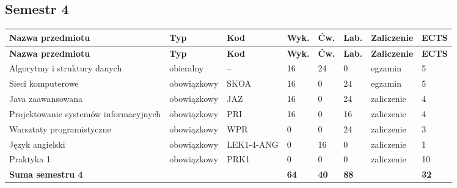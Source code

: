 \documentclass[12pt,a4paper]{article}
\newcommand{\thdrule}{\noalign{\global\setlength{\extrarowheight}{0pt}}}
\newcommand{\thdend}{\noalign{\global\setlength{\extrarowheight}{4pt}}}
\begin{document}
\subsection*{Semestr 4}

{\scriptsize
\begin{longtable}{>{\RaggedRight}m{5.0cm}m{1.9cm}m{0.75cm}m{0.85cm}m{0.85cm}m{0.85cm}m{1.45cm}m{0.9cm}}
\thdrule\toprule
\rowcolor{pjatkRed}
{\color{white}\footnotesize\textbf{\vphantom{Ag}Nazwa przedmiotu}} & {\color{white}\footnotesize\textbf{\vphantom{Ag}Typ}} & {\color{white}\footnotesize\textbf{\vphantom{Ag}Kod}} & {\color{white}\footnotesize\textbf{\vphantom{Ag}Wyk.}} & {\color{white}\footnotesize\textbf{\vphantom{Ag}Ćw.}} & {\color{white}\footnotesize\textbf{\vphantom{Ag}Lab.}} & {\color{white}\footnotesize\textbf{\vphantom{Ag}Zaliczenie}} & {\color{white}\footnotesize\textbf{\vphantom{Ag}ECTS}} \\
\midrule\thdend
\endfirsthead
\thdrule\toprule
\rowcolor{pjatkRed}
{\color{white}\footnotesize\textbf{\vphantom{Ag}Nazwa przedmiotu}} & {\color{white}\footnotesize\textbf{\vphantom{Ag}Typ}} & {\color{white}\footnotesize\textbf{\vphantom{Ag}Kod}} & {\color{white}\footnotesize\textbf{\vphantom{Ag}Wyk.}} & {\color{white}\footnotesize\textbf{\vphantom{Ag}Ćw.}} & {\color{white}\footnotesize\textbf{\vphantom{Ag}Lab.}} & {\color{white}\footnotesize\textbf{\vphantom{Ag}Zaliczenie}} & {\color{white}\footnotesize\textbf{\vphantom{Ag}ECTS}} \\
\midrule\thdend
\endhead
\rowcolor{tableElective} Algorytmy i struktury danych & {\scriptsize obieralny} & -- & 16 & 24 & 0 & {\scriptsize egzamin} & 5 \\
\rowcolor{tableRowAlt} Sieci komputerowe & {\scriptsize obowiązkowy} & SKOA & 16 & 0 & 24 & {\scriptsize egzamin} & 5 \\
\rowcolor{tableRowLight} Java zaawansowana & {\scriptsize obowiązkowy} & JAZ & 16 & 0 & 24 & {\scriptsize zaliczenie} & 4 \\
\rowcolor{tableRowAlt} Projektowanie systemów informacyjnych & {\scriptsize obowiązkowy} & PRI & 16 & 0 & 16 & {\scriptsize zaliczenie} & 4 \\
\rowcolor{tableRowLight} Warsztaty programistyczne & {\scriptsize obowiązkowy} & WPR & 0 & 0 & 24 & {\scriptsize zaliczenie} & 3 \\
\rowcolor{tableRowAlt} Język angielski & {\scriptsize obowiązkowy} & LEK1-4-ANG & 0 & 16 & 0 & {\scriptsize zaliczenie} & 1 \\
\rowcolor{tableRowLight} Praktyka 1 & {\scriptsize obowiązkowy} & PRK1 & 0 & 0 & 0 & {\scriptsize zaliczenie} & 10 \\
\midrule[\heavyrulewidth]
\rowcolor{tableSummary} \textbf{Suma semestru 4} & & & \textbf{64} & \textbf{40} & \textbf{88} & & \textbf{32} \\
\bottomrule
\end{longtable}}
\end{document}
